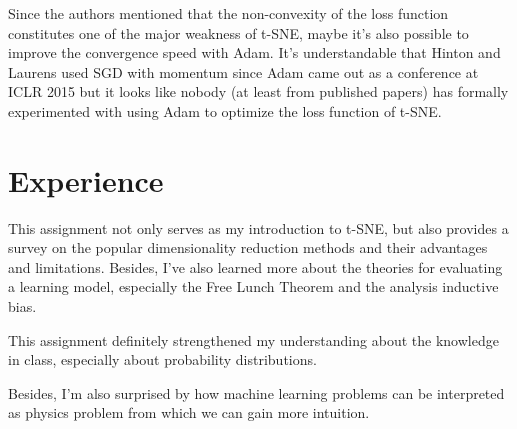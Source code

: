 \documentclass[letter,10pt]{article}
\begin{document}
Since the authors mentioned that the non-convexity of the loss function constitutes one of the major weakness of t-SNE, maybe it's also possible to improve the convergence speed with Adam. It's understandable that Hinton and Laurens used SGD with momentum since Adam came out as a conference at ICLR 2015 but it looks like nobody (at least from published papers) has formally experimented with using Adam to optimize the loss function of t-SNE.

\section{Experience}

This assignment not only serves as my introduction to t-SNE, but also provides a survey on the popular dimensionality reduction methods and their advantages and limitations. Besides, I've also learned more about the theories for evaluating a learning model, especially the Free Lunch Theorem and the analysis  inductive bias.

This assignment definitely strengthened my understanding about the knowledge in class, especially about probability distributions.

Besides, I'm also surprised by how machine learning problems can be interpreted as physics problem from which we can gain more intuition.

\medskip



\end{document}
